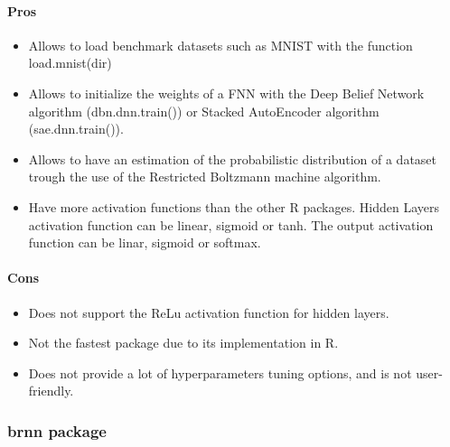 \documentclass[letter]{article}\usepackage[]{graphicx}\usepackage[]{color}
\begin{document}
\paragraph{Pros}
\begin{itemize}
\item Allows to load benchmark datasets such as MNIST with the function load.mnist(dir)
\item Allows to initialize the weights of a FNN with the Deep Belief Network algorithm (dbn.dnn.train()) or Stacked AutoEncoder algorithm (sae.dnn.train()).
\item Allows to have an estimation of the probabilistic distribution of a dataset trough the use of the Restricted Boltzmann machine algorithm.
\item Have more activation functions than the other R packages. Hidden Layers activation function can be linear, sigmoid or tanh. The output activation function can be linar, sigmoid or softmax.
\end{itemize}
\paragraph{Cons}
\begin{itemize}
\item Does not support the ReLu activation function for hidden layers.
\item Not the fastest package due to its implementation in R.
\item Does not provide a lot of hyperparameters tuning options, and is not user-friendly.
\end{itemize}

\subsubsection{brnn package}
\end{document}
